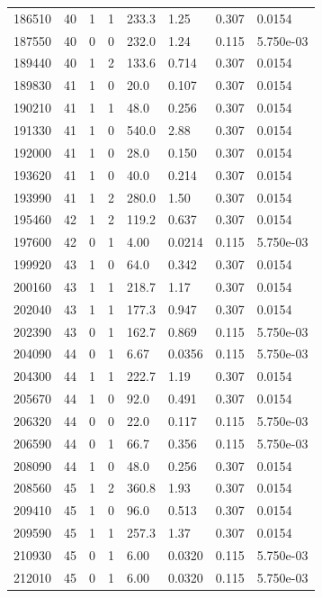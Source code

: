 \documentclass[preview]{standalone}
\begin{document}
{{{{{{\begin{tabular}{L{1.2cm}C{1.2cm} C{0.3cm}C{0.5cm} C{1.4cm}C{1.4cm} C{1.4cm}C{1.4cm}}
  186510  &    40  & 1     &  1 &  233.3  & 1.25  & 0.307 &  0.0154   \\ 
  187550  &    40  & 0     &  0 &  232.0  & 1.24  & 0.115 &  5.750e-03   \\ 
  189440  &    40  & 1     &  2 &  133.6  & 0.714  & 0.307 &  0.0154   \\ 
  189830  &    41  & 1     &  0 &  20.0  & 0.107  & 0.307 &  0.0154   \\ 
  190210  &    41  & 1     &  1 &  48.0  & 0.256  & 0.307 &  0.0154   \\ 
  191330  &    41  & 1     &  0 &  540.0  & 2.88  & 0.307 &  0.0154   \\ 
  192000  &    41  & 1     &  0 &  28.0  & 0.150  & 0.307 &  0.0154   \\ 
  193620  &    41  & 1     &  0 &  40.0  & 0.214  & 0.307 &  0.0154   \\ 
  193990  &    41  & 1     &  2 &  280.0  & 1.50  & 0.307 &  0.0154   \\ 
  195460  &    42  & 1     &  2 &  119.2  & 0.637  & 0.307 &  0.0154   \\ 
  197600  &    42  & 0     &  1 &  4.00  & 0.0214  & 0.115 &  5.750e-03   \\ 
  199920  &    43  & 1     &  0 &  64.0  & 0.342  & 0.307 &  0.0154   \\ 
  200160  &    43  & 1     &  1 &  218.7  & 1.17  & 0.307 &  0.0154   \\ 
  202040  &    43  & 1     &  1 &  177.3  & 0.947  & 0.307 &  0.0154   \\ 
  202390  &    43  & 0     &  1 &  162.7  & 0.869  & 0.115 &  5.750e-03   \\ 
  204090  &    44  & 0     &  1 &  6.67  & 0.0356  & 0.115 &  5.750e-03   \\ 
  204300  &    44  & 1     &  1 &  222.7  & 1.19  & 0.307 &  0.0154   \\ 
  205670  &    44  & 1     &  0 &  92.0  & 0.491  & 0.307 &  0.0154   \\ 
  206320  &    44  & 0     &  0 &  22.0  & 0.117  & 0.115 &  5.750e-03   \\ 
  206590  &    44  & 0     &  1 &  66.7  & 0.356  & 0.115 &  5.750e-03   \\ 
  208090  &    44  & 1     &  0 &  48.0  & 0.256  & 0.307 &  0.0154   \\ 
  208560  &    45  & 1     &  2 &  360.8  & 1.93  & 0.307 &  0.0154   \\ 
  209410  &    45  & 1     &  0 &  96.0  & 0.513  & 0.307 &  0.0154   \\ 
  209590  &    45  & 1     &  1 &  257.3  & 1.37  & 0.307 &  0.0154   \\ 
  210930  &    45  & 0     &  1 &  6.00  & 0.0320  & 0.115 &  5.750e-03   \\ 
  212010  &    45  & 0     &  1 &  6.00  & 0.0320  & 0.115 &  5.750e-03   \\ 
\hline 
\end{tabular} 

}}}}}}
\end{document}
